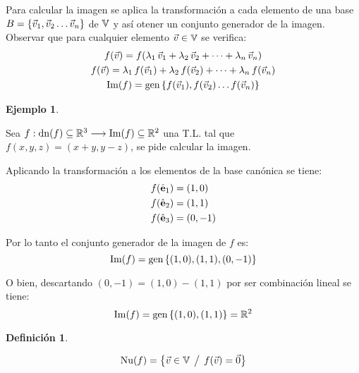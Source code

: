 \documentclass[a5paper,12pt,twoside]{book}
\newtheorem{defn}{{Definición}}[chapter]
\newtheorem{example}{{Ejemplo}}[chapter]
\begin{document}
Para calcular la imagen se aplica la transformación a cada elemento de una base $B={ \left\{ {\Vec{v}_1,\Vec{v}_2 \dots \Vec{v}_n} \right\} }$ de $\mathbb{V}$ y así otener un conjunto generador de la imagen. Observar que para cualquier elemento $\Vec{v}\in\mathbb{V}$ se verifica:
\begin{gather*}
    f(\Vec{v}) = f(\lambda_1 \, \Vec{v}_1 + \lambda_2 \, \Vec{v}_2 + \dots + \lambda_n \, \Vec{v}_n)
    \\
    f(\Vec{v}) = \lambda_1 \, f(\Vec{v}_1) + \lambda_2 \, f(\Vec{v}_2) + \dots + \lambda_n \, f(\Vec{v}_n)
    \\
    \operatorname{Im}(f) = \operatorname{gen}{ \left\{ {f(\Vec{v}_1),f(\Vec{v}_2) \dots f(\Vec{v}_n)} \right\} }
\end{gather*}

\begin{mdframed}[style=MyFrame2]
    \begin{example}
    \end{example}
    Sea $f:\operatorname{dn}(f) \subseteq \mathbb{R}^3 \longrightarrow \operatorname{Im}(f) \subseteq \mathbb{R}^2$ una T.L. tal que $f(x,y,z)=(x+y,y-z)$, se pide calcular la imagen.
    
    Aplicando la transformación a los elementos de la base canónica se tiene:
    \begin{align*}
        f(\hat{\textbf{e}}_1) &= (1,0)
        \\
        f(\hat{\textbf{e}}_2) &= (1,1)
        \\
        f(\hat{\textbf{e}}_3) &= (0,-1)
    \end{align*}
    
    Por lo tanto el conjunto generador de la imagen de $f$ es:
    \begin{equation*}
        \operatorname{Im}(f) = \operatorname{gen}{ \left\{ {(1,0),(1,1),(0,-1)} \right\} }
    \end{equation*}
    
    O bien, descartando $(0,-1)=(1,0)-(1,1)$ por ser combinación lineal se tiene:
    \begin{equation*}
        \operatorname{Im}(f) = \operatorname{gen}{ \left\{ {(1,0),(1,1)} \right\} } = \mathbb{R}^2
    \end{equation*}
\end{mdframed}

\begin{mdframed}[style=MyFrame1]
    \begin{defn}
    \end{defn}
    \begin{equation*}
        \operatorname{Nu}(f) = { \left\{ {\Vec{v} \in \mathbb{V} \hspace{1ex} \big/ \hspace{1ex} f(\Vec{v})=\Vec{0}} \right\} }
    \end{equation*}
\end{mdframed}
\end{document}
